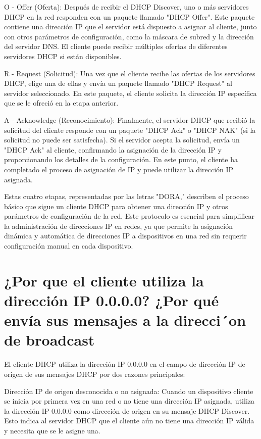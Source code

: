 O - Offer (Oferta):
Después de recibir el DHCP Discover, uno o más servidores DHCP en la red responden con un paquete llamado "DHCP Offer". Este paquete contiene una dirección IP que el servidor está dispuesto a asignar al cliente, junto con otros parámetros de configuración, como la máscara de subred y la dirección del servidor DNS. El cliente puede recibir múltiples ofertas de diferentes servidores DHCP si están disponibles.

R - Request (Solicitud):
Una vez que el cliente recibe las ofertas de los servidores DHCP, elige una de ellas y envía un paquete llamado "DHCP Request" al servidor seleccionado. En este paquete, el cliente solicita la dirección IP específica que se le ofreció en la etapa anterior.

A - Acknowledge (Reconocimiento):
Finalmente, el servidor DHCP que recibió la solicitud del cliente responde con un paquete "DHCP Ack" o "DHCP NAK" (si la solicitud no puede ser satisfecha). Si el servidor acepta la solicitud, envía un "DHCP Ack" al cliente, confirmando la asignación de la dirección IP y proporcionando los detalles de la configuración. En este punto, el cliente ha completado el proceso de asignación de IP y puede utilizar la dirección IP asignada.

Estas cuatro etapas, representadas por las letras "DORA," describen el proceso básico que sigue un cliente DHCP para obtener una dirección IP y otros parámetros de configuración de la red. Este protocolo es esencial para simplificar la administración de direcciones IP en redes, ya que permite la asignación dinámica y automática de direcciones IP a dispositivos en una red sin requerir configuración manual en cada dispositivo.

\section{¿Por que el cliente utiliza la dirección IP 0.0.0.0? ¿Por qué envía
	sus mensajes a la direcci´on de broadcast}

	El cliente DHCP utiliza la dirección IP 0.0.0.0 en el campo de dirección IP de origen de sus mensajes DHCP por dos razones principales:
	
	Dirección IP de origen desconocida o no asignada: Cuando un dispositivo cliente se inicia por primera vez en una red o no tiene una dirección IP asignada, utiliza la dirección IP 0.0.0.0 como dirección de origen en su mensaje DHCP Discover. Esto indica al servidor DHCP que el cliente aún no tiene una dirección IP válida y necesita que se le asigne una.
	
